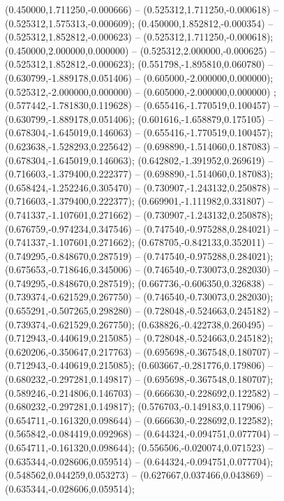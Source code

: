  (0.450000,1.711250,-0.000666) -- (0.525312,1.711250,-0.000618) -- (0.525312,1.575313,-0.000609);
 (0.450000,1.852812,-0.000354) -- (0.525312,1.852812,-0.000623) -- (0.525312,1.711250,-0.000618);
 (0.450000,2.000000,0.000000) -- (0.525312,2.000000,-0.000625) -- (0.525312,1.852812,-0.000623);
 (0.551798,-1.895810,0.060780) -- (0.630799,-1.889178,0.051406) -- (0.605000,-2.000000,0.000000);
 (0.525312,-2.000000,0.000000) -- (0.605000,-2.000000,0.000000) ;
 (0.577442,-1.781830,0.119628) -- (0.655416,-1.770519,0.100457) -- (0.630799,-1.889178,0.051406);
 (0.601616,-1.658879,0.175105) -- (0.678304,-1.645019,0.146063) -- (0.655416,-1.770519,0.100457);
 (0.623638,-1.528293,0.225642) -- (0.698890,-1.514060,0.187083) -- (0.678304,-1.645019,0.146063);
 (0.642802,-1.391952,0.269619) -- (0.716603,-1.379400,0.222377) -- (0.698890,-1.514060,0.187083);
 (0.658424,-1.252246,0.305470) -- (0.730907,-1.243132,0.250878) -- (0.716603,-1.379400,0.222377);
 (0.669901,-1.111982,0.331807) -- (0.741337,-1.107601,0.271662) -- (0.730907,-1.243132,0.250878);
 (0.676759,-0.974234,0.347546) -- (0.747540,-0.975288,0.284021) -- (0.741337,-1.107601,0.271662);
 (0.678705,-0.842133,0.352011) -- (0.749295,-0.848670,0.287519) -- (0.747540,-0.975288,0.284021);
 (0.675653,-0.718646,0.345006) -- (0.746540,-0.730073,0.282030) -- (0.749295,-0.848670,0.287519);
 (0.667736,-0.606350,0.326838) -- (0.739374,-0.621529,0.267750) -- (0.746540,-0.730073,0.282030);
 (0.655291,-0.507265,0.298280) -- (0.728048,-0.524663,0.245182) -- (0.739374,-0.621529,0.267750);
 (0.638826,-0.422738,0.260495) -- (0.712943,-0.440619,0.215085) -- (0.728048,-0.524663,0.245182);
 (0.620206,-0.350647,0.217763) -- (0.695698,-0.367548,0.180707) -- (0.712943,-0.440619,0.215085);
 (0.603667,-0.281776,0.179806) -- (0.680232,-0.297281,0.149817) -- (0.695698,-0.367548,0.180707);
 (0.589246,-0.214806,0.146703) -- (0.666630,-0.228692,0.122582) -- (0.680232,-0.297281,0.149817);
 (0.576703,-0.149183,0.117906) -- (0.654711,-0.161320,0.098644) -- (0.666630,-0.228692,0.122582);
 (0.565842,-0.084419,0.092968) -- (0.644324,-0.094751,0.077704) -- (0.654711,-0.161320,0.098644);
 (0.556506,-0.020074,0.071523) -- (0.635344,-0.028606,0.059514) -- (0.644324,-0.094751,0.077704);
 (0.548562,0.044259,0.053273) -- (0.627667,0.037466,0.043869) -- (0.635344,-0.028606,0.059514);
